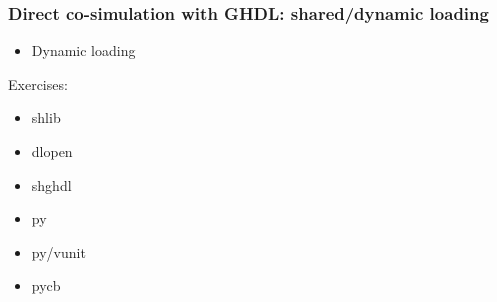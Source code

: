 \documentclass[xcolor={usenames,dvipsnames}]{beamer}
\begin{document}
\begin{frame}
\frametitle{Direct co-simulation with GHDL: shared/dynamic loading}

\begin{itemize}
\item Dynamic loading \href{https://ghdl.github.io/ghdl-cosim/vhpidirect/dynamic.html}{\faBook}
\end{itemize}

\vfill

Exercises:
\begin{itemize}
\item shlib
\href{https://ghdl.github.io/ghdl-cosim/vhpidirect/examples/shared.html\#shlib}{\faBook}
\href{https://github.com/ghdl/ghdl-cosim/blob/master/vhpidirect/shared/shlib}{\faCode}

\item dlopen
\href{https://ghdl.github.io/ghdl-cosim/vhpidirect/examples/shared.html\#dlopen}{\faBook}
\href{https://github.com/ghdl/ghdl-cosim/blob/master/vhpidirect/shared/dlopen}{\faCode}

\item shghdl
\href{https://ghdl.github.io/ghdl-cosim/vhpidirect/examples/shared.html\#shghdl}{\faBook}
\href{https://github.com/ghdl/ghdl-cosim/blob/master/vhpidirect/shared/shghdl}{\faCode}

\item py
\href{https://ghdl.github.io/ghdl-cosim/vhpidirect/examples/shared.html\#py}{\faBook}
\href{https://github.com/ghdl/ghdl-cosim/blob/master/vhpidirect/shared/py}{\faCode}

\item py/vunit
\href{https://ghdl.github.io/ghdl-cosim/vhpidirect/examples/shared.html\#py-vunit}{\faBook}
\href{https://github.com/ghdl/ghdl-cosim/blob/master/vhpidirect/shared/py/vunit}{\faCode}

\item pycb
\href{https://ghdl.github.io/ghdl-cosim/vhpidirect/examples/shared.html\#pycb}{\faBook}
\href{https://github.com/ghdl/ghdl-cosim/blob/master/vhpidirect/shared/pycb}{\faCode}

\end{itemize}
\end{frame}
\end{document}
